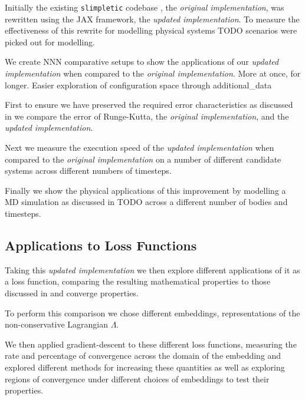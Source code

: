\documentclass[10pt]{iopart}
\begin{document}

\newcommand{\orgimpl}{\textit{original implementation}}
\newcommand{\updimpl}{\textit{updated implementation}}

Initially the existing \texttt{slimpletic} codebase \cite{originalCode}, the \orgimpl{}, was rewritten using the JAX framework, the \updimpl{}. To measure the effectiveness of this rewrite for modelling physical systems TODO scenarios were picked out for modelling.

We create NNN comparative setups to show the applications of our \updimpl{} when compared to the \orgimpl{}. More at once, for longer. Easier exploration of configuration space through additional\_data

First to ensure we have preserved the required error characteristics as discussed in  we compare the error of Runge-Kutta, the \orgimpl{}, and the \updimpl{}.

Next we measure the execution speed of the \updimpl{} when compared to the \orgimpl{} on a number of different candidate systems across different numbers of timesteps.

Finally we show the physical applications of this improvement by modelling a MD simulation as discussed in TODO across a different number of bodies and timesteps.


\subsection{Applications to Loss Functions}

Taking this \updimpl{} we then explore different applications of it as a loss function, comparing the resulting mathematical properties to those discussed in  and converge properties.

To perform this comparison we chose different embeddings, representations of the non-conservative Lagrangian $\Lambda$.

We then applied gradient-descent\cite{gradientDescent} to these different loss functions, measuring the rate and percentage of convergence across the domain of the embedding and explored different methods for increasing these quantities as well as exploring regions of convergence under different choices of embeddings to test their properties.
\end{document}
